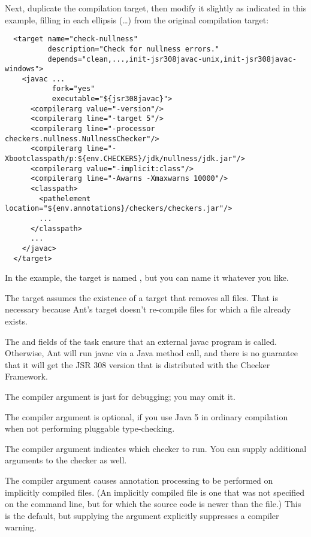 Next, duplicate the compilation target, then modify it slightly as
indicated in this example, filling in each ellipsis (\ldots) from the
original compilation target:

\begin{smaller}
\begin{Verbatim}
  <target name="check-nullness"
          description="Check for nullness errors."
          depends="clean,...,init-jsr308javac-unix,init-jsr308javac-windows">
    <javac ...
           fork="yes"
           executable="${jsr308javac}">
      <compilerarg value="-version"/>
      <compilerarg line="-target 5"/>
      <compilerarg line="-processor checkers.nullness.NullnessChecker"/>
      <compilerarg line="-Xbootclasspath/p:${env.CHECKERS}/jdk/nullness/jdk.jar"/>
      <compilerarg value="-implicit:class"/>
      <compilerarg line="-Awarns -Xmaxwarns 10000"/>
      <classpath>
        <pathelement location="${env.annotations}/checkers/checkers.jar"/>
        ...
      </classpath>
      ...
    </javac>
  </target>
\end{Verbatim}
\end{smaller}

In the example, the target is named , but you can
name it whatever you like.

The target assumes the existence of a  target that removes all
 files.  That is necessary because Ant's  target
doesn't re-compile  files for which a  file
already exists.

The  and  fields of the  task
ensure that an external javac program is called.  Otherwise, Ant will run
javac via a Java method call, and there is no guarantee that it will get
the JSR 308 version that is distributed with the Checker Framework.

The  compiler argument is just for debugging; you may omit
it.

The  compiler argument is optional, if you use Java 5 in
ordinary compilation when not performing pluggable type-checking.

The  compiler argument indicates which checker to
run.  You can supply additional arguments to the checker as well.

The  compiler argument causes annotation processing
to be performed on implicitly compiled files.  (An implicitly compiled file
is one that was not specified on the command line, but for which the source
code is newer than the  file.)  This is the default, but
supplying the argument explicitly suppresses a compiler warning.

